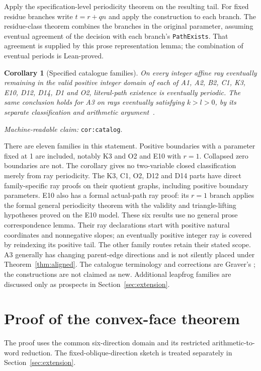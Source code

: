 \documentclass[11pt]{amsart}
\newcommand{\record}[1]{\nolinkurl{#1}}
\newcommand{\claimid}[1]{\par\nopagebreak\noindent\textit{Machine-readable claim:} \record{#1}.\par}
\newtheorem{catalogcor}{Corollary}
\theoremstyle{definition}\newtheorem{definition}{Definition}
\begin{document}
Apply the specification-level periodicity theorem on the resulting tail. For fixed
residue branches write $t=r+qn$ and apply the construction to each
branch. The residue-class theorem combines the branches in the
original parameter, assuming eventual
agreement of the decision with each branch's \record{PathExists}.
That agreement is supplied by this prose representation lemma;
the combination of eventual periods is Lean-proved.
\begin{catalogcor}[Specified catalogue families]\label{cor:catalog}
On every integer affine ray eventually remaining in the valid positive
integer domain of each of A1, A2, B2, C1, K3, E10, D12, D14, D1 and O2,
literal-path existence is eventually periodic. The same conclusion
holds for A3 on rays eventually satisfying $k>l>0$, by its separate
classification and arithmetic argument~\cite{A3}.
\end{catalogcor}
\claimid{cor:catalog}
There are eleven families in this statement. Positive boundaries with
a parameter fixed at 1 are included, notably K3 and O2 and E10 with
$r=1$. Collapsed zero boundaries are not. The corollary gives no
two-variable closed classification merely from ray periodicity.
The K3, C1, O2, D12 and D14 parts have direct family-specific ray proofs
on their quotient graphs, including positive boundary parameters. E10 also
has a formal actual-path ray proof: its $r=1$ branch applies the formal
general periodicity theorem with the validity and triangle-lifting
hypotheses proved on the E10 model. These six results use no general
prose correspondence lemma. Their ray declarations start with
positive natural coordinates and nonnegative slopes; an eventually positive
integer ray is covered by reindexing its positive tail. The other family
routes retain their stated scope.
A3 generally has changing parent-edge directions and is not silently
placed under Theorem~\ref{thm:aligned}. The catalogue terminology and
corrections are Graver's \cite{Graver}; the constructions are not claimed
as new. Additional leapfrog families are discussed only as prospects
in Section~\ref{sec:extension}.

\section{Proof of the convex-face theorem}\label{sec:proof}
The proof uses the common six-direction domain and its restricted
arithmetic-to-word reduction. The fixed-oblique-direction sketch is
treated separately in Section~\ref{sec:extension}.
\end{document}
